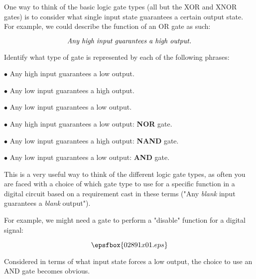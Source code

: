 

One way to think of the basic logic gate types (all but the XOR and XNOR gates) is to consider what single input state guarantees a certain output state.  For example, we could describe the function of an OR gate as such:

$$\hbox{\it Any high input guarantees a high output.}$$

Identify what type of gate is represented by each of the following phrases:

\medskip
\item{$\bullet$} Any high input guarantees a low output.
\item{$\bullet$} Any low input guarantees a high output.
\item{$\bullet$} Any low input guarantees a low output.
\medskip







\medskip
\item{$\bullet$} Any high input guarantees a low output: {\bf NOR} gate.
\item{$\bullet$} Any low input guarantees a high output: {\bf NAND} gate.
\item{$\bullet$} Any low input guarantees a low output: {\bf AND} gate.
\medskip







This is a very useful way to think of the different logic gate types, as often you are faced with a choice of which gate type to use for a specific function in a digital circuit based on a requirement cast in these terms ("Any {\it blank} input guarantees a {\it blank} output").

For example, we might need a gate to perform a "disable" function for a digital signal:

$$\epsfbox{02891x01.eps}$$

Considered in terms of what input state forces a low output, the choice to use an AND gate becomes obvious.




